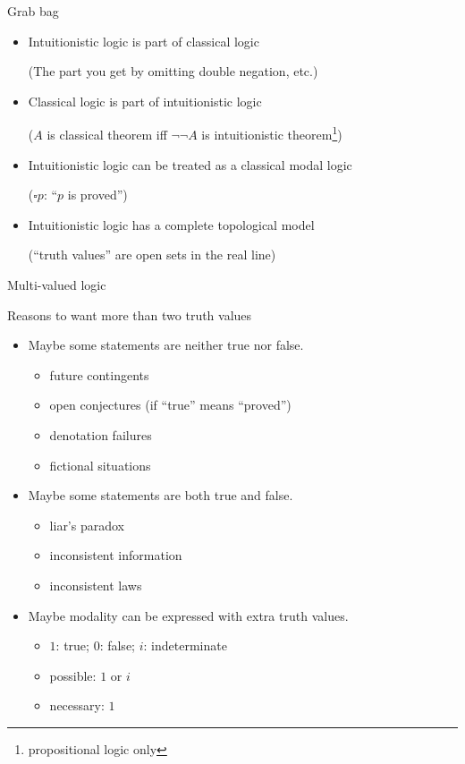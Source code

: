 \documentclass{beamer}
\newcommand{\nec}{\square}
\newcommand{\sect}[1]{\begin{frame}\centerline{\large #1}\end{frame}}
\begin{document}
\begin{frame}{Grab bag}

\begin{itemize}
\item Intuitionistic logic is part of classical logic

    (The part you get by omitting double negation, etc.)

\item Classical logic is part of intuitionistic logic

    ($A$ is classical theorem iff $\lnot\lnot A$ is intuitionistic theorem\footnote{propositional logic only})

\item Intuitionistic logic can be treated as a classical modal logic

    ($\nec p$: ``$p$ is proved'')

\item Intuitionistic logic has a complete topological model

    (``truth values'' are open sets in the real line)
\end{itemize}
\end{frame}

\sect{Multi-valued logic}

\begin{frame}{Reasons to want more than two truth values}
\begin{itemize}
\item Maybe some statements are neither true nor false.
    \begin{itemize}
    \item future contingents
    \item open conjectures (if ``true'' means ``proved'')
    \item denotation failures
    \item fictional situations
    \end{itemize}
\item Maybe some statements are both true and false.
    \begin{itemize}
    \item liar's paradox
    \item inconsistent information
    \item inconsistent laws
    \end{itemize}
\item Maybe modality can be expressed with extra truth values.
    \begin{itemize}
    \item $1$: true; $0$: false; $i$: indeterminate
    \item possible: $1$ or $i$
    \item necessary: $1$
    \end{itemize}
\end{itemize}
\end{frame}
\end{document}
